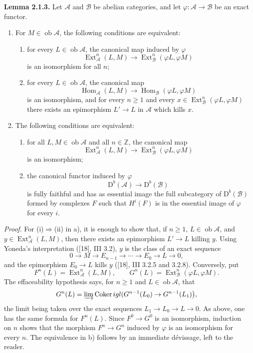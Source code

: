 \documentclass[11pt]{article}
\providecommand{\Ext}{\operatorname{Ext}}
\providecommand{\Ob}{\operatorname{ob}}
\begin{document}
\textbf{Lemma 2.1.3.} Let $\mathcal A$ and $\mathcal B$ be abelian categories, and let $\varphi:\mathcal A\to\mathcal B$ be an exact functor.
\begin{enumerate}[label=\alph*)]
\item For $M\in\Ob\mathcal A$, the following conditions are equivalent:
\begin{enumerate}[label=(\roman*)]
\item for every $L\in\Ob\mathcal A$, the canonical map induced by $\varphi$
\[
\Ext^n_{\mathcal A}(L,M)\longrightarrow\Ext^n_{\mathcal B}(\varphi L,\varphi M)
\]
is an isomorphism for all $n$;
\item for every $L\in\Ob\mathcal A$, the canonical map
\[
\operatorname{Hom}_{\mathcal A}(L,M)\longrightarrow\operatorname{Hom}_{\mathcal B}(\varphi L,\varphi M)
\]
is an isomorphism, and for every $n\ge1$ and every $x\in\Ext^n_{\mathcal B}(\varphi L,\varphi M)$ there exists an epimorphism $L'\to L$ in $\mathcal A$ which kills $x$.
\end{enumerate}
\item The following conditions are equivalent:
\begin{enumerate}[label=(\roman*)]
\item for all $L,M\in\Ob\mathcal A$ and all $n\in\mathbb Z$, the canonical map
\[
\Ext^n_{\mathcal A}(L,M)\longrightarrow\Ext^n_{\mathcal B}(\varphi L,\varphi M)
\]
is an isomorphism;
\item the canonical functor induced by $\varphi$
\[
\mathrm D^b(\mathcal A)\longrightarrow\mathrm D^b(\mathcal B)
\]
is fully faithful and has as essential image the full subcategory of $\mathrm D^b(\mathcal B)$ formed by complexes $F$ such that $H^i(F)$ is in the essential image of $\varphi$ for every $i$.
\end{enumerate}
\end{enumerate}

\emph{Proof.} For (i)$\Rightarrow$(ii) in a), it is enough to show that, if $n\ge1$, $L\in\Ob\mathcal A$, and $y\in\Ext^n_{\mathcal A}(L,M)$, then there exists an epimorphism $L'\to L$ killing $y$. Using Yoneda's interpretation ([18], III 3.2), $y$ is the class of an exact sequence
\[
0\longrightarrow M\longrightarrow E_{n-1}\longrightarrow\cdots\longrightarrow E_0\longrightarrow L\longrightarrow0,
\]
and the epimorphism $E_0\to L$ kills $y$ ([18], III 3.2.5 and 3.2.8). Conversely, put
\[
F^n(L)=\Ext^n_{\mathcal A}(L,M),\qquad
G^n(L)=\Ext^n_{\mathcal B}(\varphi L,\varphi M).
\]
The effaceability hypothesis says, for $n\ge1$ and $L\in\Ob\mathcal A$, that
\[
G^n(L)=\varinjlim\operatorname{Coker}igl(G^{n-1}(L_0)\to G^{n-1}(L_1)\bigr),
\]
the limit being taken over the exact sequences $L_1\to L_0\to L\to0$. As above, one has the same formula for $F^n(L)$. Since $F^0\to G^0$ is an isomorphism, induction on $n$ shows that the morphism $F^n\to G^n$ induced by $\varphi$ is an isomorphism for every $n$. The equivalence in b) follows by an immediate dévissage, left to the reader.
\end{document}
